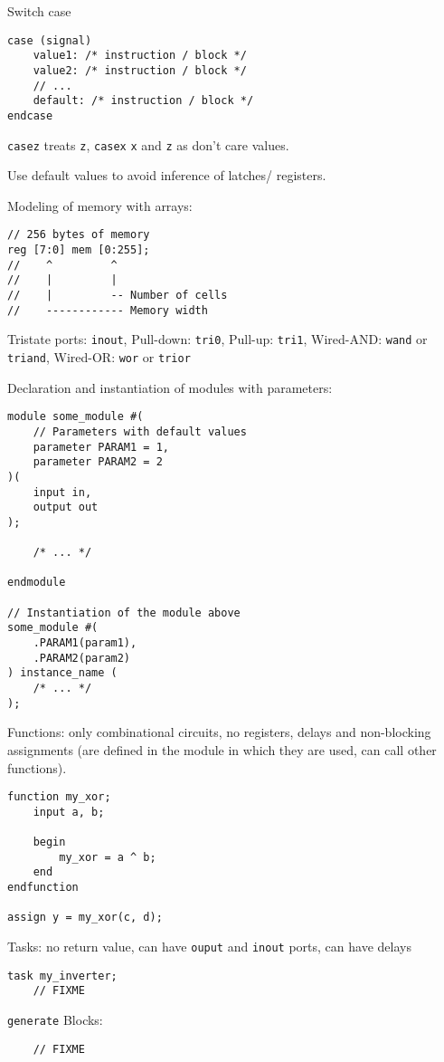 \documentclass[fontsize=11pt,a4paper]{scrartcl}
\begin{document}
Switch case
\begin{lstlisting}
case (signal)
	value1: /* instruction / block */
	value2: /* instruction / block */
	// ...
	default: /* instruction / block */
endcase
\end{lstlisting}

\lstinline!casez! treats \lstinline!z!, \lstinline!casex! \lstinline!x! and \lstinline!z! as don't care values.

Use default values to avoid inference of latches/ registers.

Modeling of memory with arrays:
\begin{lstlisting}
// 256 bytes of memory
reg [7:0] mem [0:255];
//    ^         ^
//    |         |
//    |         -- Number of cells
//    ------------ Memory width
\end{lstlisting}

Tristate ports: \lstinline!inout!, Pull-down: \lstinline!tri0!, Pull-up: \lstinline!tri1!, Wired-AND: \lstinline!wand! or \lstinline!triand!, Wired-OR: \lstinline!wor! or \lstinline!trior!

Declaration and instantiation of modules with parameters:
\begin{lstlisting}
module some_module #(
	// Parameters with default values
	parameter PARAM1 = 1,
	parameter PARAM2 = 2
)(
	input in,
	output out
);

	/* ... */

endmodule

// Instantiation of the module above
some_module #(
	.PARAM1(param1),
	.PARAM2(param2)
) instance_name (
	/* ... */
);
\end{lstlisting}

Functions: only combinational circuits, no registers, delays and non-blocking assignments (are defined in the module in which they are used, can call other functions).
\begin{lstlisting}
function my_xor;
	input a, b;

	begin
		my_xor = a ^ b;
	end
endfunction

assign y = my_xor(c, d);
\end{lstlisting}

Tasks: no return value, can have \lstinline!ouput! and \lstinline!inout! ports, can have delays
\begin{lstlisting}
task my_inverter;
	// FIXME
\end{lstlisting}

\lstinline!generate! Blocks:
\begin{lstlisting}
	// FIXME
\end{lstlisting}
\end{document}
